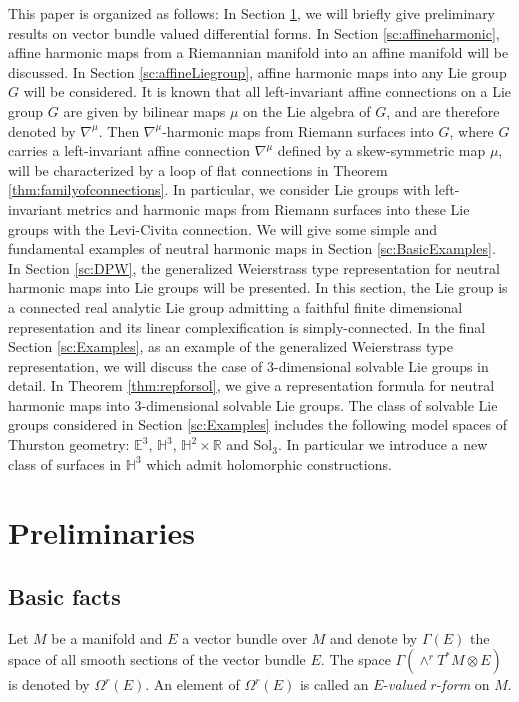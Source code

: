 \documentclass[12pt]{amsart}
\theoremstyle{definition}
\theoremstyle{remark}
\numberwithin{equation}{section}
\begin{document}
 This paper is organized as follows:
 In Section \ref{sc:Pre}, we will briefly give preliminary 
 results on vector bundle valued differential forms. 
 In Section  \ref{sc:affineharmonic}, 
 affine harmonic maps from a Riemannian manifold into an affine manifold will be 
 discussed. 
 In Section \ref{sc:affineLiegroup}, affine harmonic maps into any Lie group $G$ 
 will be considered. 
 It is known that 
 all left-invariant affine connections on a Lie group  $G$
 are given by bilinear maps $\mu$ on the Lie algebra of $G$, and are therefore denoted by  ${\nabla^{\mu}}$.
 Then ${\nabla^{\mu}}$-harmonic maps
 from Riemann surfaces 
 into $G$, where $G$ carries a left-invariant affine connection ${\nabla^{\mu}}$ defined
 by a  skew-symmetric map $\mu$,  will be characterized by a loop of flat connections in Theorem 
 \ref{thm:familyofconnections}.
 In particular, we consider Lie groups with 
 left-invariant metrics
 and harmonic maps from Riemann surfaces into these Lie groups with the Levi-Civita connection. 
 We will give some simple and fundamental examples of 
 neutral harmonic maps in Section \ref{sc:BasicExamples}.
 In Section \ref{sc:DPW}, the generalized Weierstrass type representation for 
 neutral harmonic maps into Lie groups will be presented. 
 In this section, the Lie group  
 is a connected real analytic Lie group 
 admitting a faithful finite dimensional representation and 
 its linear complexification is simply-connected.
 In the final Section \ref{sc:Examples}, 
 as an example of the generalized Weierstrass type representation, we will discuss 
 the case of $3$-dimensional solvable Lie groups in detail. In Theorem 
 \ref{thm:repforsol}, 
 we give a representation formula for neutral harmonic maps into 
 $3$-dimensional solvable Lie groups. 
 The class of solvable Lie groups considered in Section \ref{sc:Examples} 
 includes the following model spaces of Thurston geometry:
 $\mathbb E^3$, $\mathbb H^3$, $\mathbb H^2 \times \mathbb R$ 
 and $\mathrm{Sol}_3$. In particular we introduce a new class 
 of surfaces in $\mathbb H^3$ which admit holomorphic 
 constructions.

\section{Preliminaries}\label{sc:Pre}
\subsection{Basic facts}
 Let $M$ be a manifold and $E$ a vector bundle over $M$ and 
 denote by $\varGamma(E)$ 
 the space of all smooth sections of the vector bundle $E$.
 The space $\varGamma(\wedge^{r}T^{*}M\otimes{E})$ is 
 denoted by $\Omega^{r}(E)$. An element of $\Omega^{r}(E)$ is called an
 $E$-\textit{valued} $r$-\textit{form} on $M$. 
\end{document}
